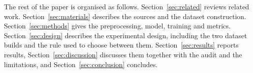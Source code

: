 The rest of the paper is organised as follows. Section~\ref{sec:related} reviews related work. Section~\ref{sec:materials} describes the sources and the dataset construction. Section~\ref{sec:methods} gives the preprocessing, model, training and metrics. Section~\ref{sec:design} describes the experimental design, including the two dataset builds and the rule used to choose between them. Section~\ref{sec:results} reports results, Section~\ref{sec:discussion} discusses them together with the audit and the limitations, and Section~\ref{sec:conclusion} concludes.
